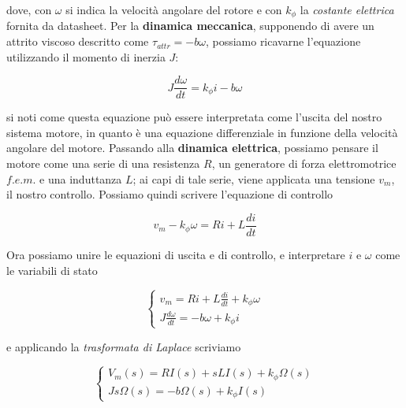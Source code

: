 		\noindent dove, con $\omega$ si indica la velocità angolare del rotore e con $k_{\phi}$ la \textit{costante elettrica} fornita da datasheet.\newline
		Per la \textbf{dinamica meccanica}, supponendo di avere un attrito viscoso descritto come $\tau_{attr} = -b\omega$, possiamo ricavarne l'equazione utilizzando il momento di inerzia $J$:
	
		\begin{equation}
			J\frac{d\omega}{dt} = k_{\phi}i - b\omega
			\label{eq:uscita}
		\end{equation}  
	
		\noindent si noti come questa equazione può essere interpretata come l'uscita del nostro sistema motore, in quanto è una equazione differenziale in funzione della velocità angolare del motore. \newline
		Passando alla \textbf{dinamica elettrica}, possiamo pensare il motore come una serie di una resistenza $R$, un generatore di forza elettromotrice $f.e.m.$ e una induttanza $L$; ai capi di tale serie, viene applicata una tensione $v_m$, il nostro controllo. Possiamo quindi scrivere l'equazione di controllo
	
		\begin{equation}
			v_m -k_{\phi}\omega = Ri + L \frac{di}{dt}
			\label{eq:controllo}
		\end{equation}    
	
		\noindent Ora possiamo unire le equazioni di uscita e di controllo, e interpretare $i$ e $\omega$ come le variabili di stato
	
		\begin{equation}
			\begin{cases}
				v_m = Ri + L\frac{di}{dt} + k_{\phi}\omega \\
				J\frac{d\omega}{dt} = -b\omega + k_{\phi}i
			\end{cases}
			\label{eq:dinamicaComplessiva}
		\end{equation}
	
		\noindent e applicando la \textit{trasformata di Laplace} scriviamo
	
		\begin{equation}
			\begin{cases}
				V_m(s) = RI(s) +sLI(s) + k_{\phi}\Omega(s)\\
				Js\Omega(s) = -b\Omega(s) + k_{\phi}I(s)	
			\end{cases}
			\label{eq:dinamecaComplessivaLaplace}
		\end{equation}
	

